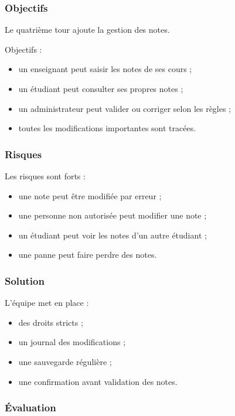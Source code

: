\documentclass[12pt,a4paper]{article}
\begin{document}
\subsubsection{Objectifs}

Le quatrième tour ajoute la gestion des notes.

Objectifs :

\begin{itemize}
    \item un enseignant peut saisir les notes de ses cours ;
    \item un étudiant peut consulter ses propres notes ;
    \item un administrateur peut valider ou corriger selon les règles ;
    \item toutes les modifications importantes sont tracées.
\end{itemize}

\subsubsection{Risques}

Les risques sont forts :

\begin{itemize}
    \item une note peut être modifiée par erreur ;
    \item une personne non autorisée peut modifier une note ;
    \item un étudiant peut voir les notes d'un autre étudiant ;
    \item une panne peut faire perdre des notes.
\end{itemize}

\subsubsection{Solution}

L'équipe met en place :

\begin{itemize}
    \item des droits stricts ;
    \item un journal des modifications ;
    \item une sauvegarde régulière ;
    \item une confirmation avant validation des notes.
\end{itemize}

\subsubsection{Évaluation}
\end{document}
